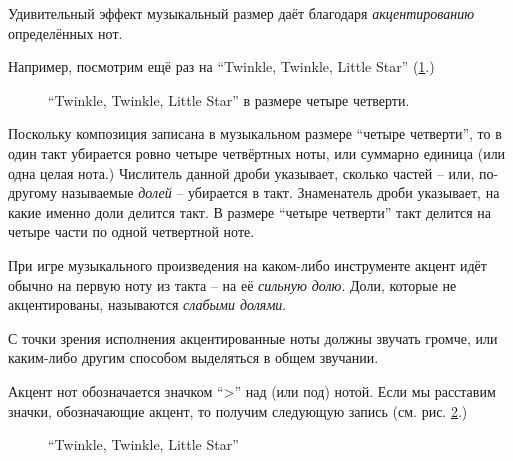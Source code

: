 \documentclass[a4paper,twoside]{book}
\begin{document}
Удивительный эффект музыкальный размер даёт благодаря \emph{акцентированию}
определённых нот.

Например, посмотрим ещё раз на ``Twinkle, Twinkle, Little Star''
(\ref{fig:lilypond-musical-scale-example-1}.)

\begin{figure}[ht]
  \caption{``Twinkle, Twinkle, Little Star'' в размере четыре четверти.}
  \centering
  \label{fig:lilypond-musical-scale-example-1}
\end{figure}

Поскольку композиция записана в музыкальном размере ``четыре четверти'', то в
один такт убирается ровно четыре четвёртных ноты, или суммарно единица (или одна
целая нота.)  Числитель данной дроби указывает, сколько частей -- или, по-другому
называемые \emph{долей} -- убирается в такт.  Знаменатель дроби указывает, на
какие именно доли делится такт.  В размере ``четыре четверти'' такт делится на
четыре части по одной четвертной ноте.

При игре музыкального произведения на каком-либо инструменте акцент идёт обычно
на первую ноту из такта -- на её \emph{сильную долю}.  Доли, которые не
акцентированы, называются \emph{слабыми долями}.

С точки зрения исполнения акцентированные ноты должны звучать громче, или
каким-либо другим способом выделяться в общем звучании.

Акцент нот обозначается значком ``>'' над (или под) нотой.  Если мы расставим
значки, обозначающие акцент, то получим следующую запись
(см. рис. \ref{fig:lilypond-musical-scale-example-2}.)

\begin{figure}[ht]
  \caption{``Twinkle, Twinkle, Little Star''}
  \centering
  \label{fig:lilypond-musical-scale-example-2}
\end{figure}
\end{document}
